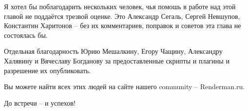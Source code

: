  Я хотел бы поблагодарить нескольких человек, чья
    помошь в работе над этой главой не поддаётся трезвой оценке. Это
    Александр Сегаль, Сергей Невшупов, Константин Харитонов – без их
    комментариев, поправок и советов эта глава не состоялась
    бы.

 Отдельная благодарность Юрию Мешалкину, Егору
    Чащину, Александру Халявину и Вячеславу Богданову за
    предоставленные скрипты и плагины и разрешение их
    опубликовать.

 Вы можете найти всех этих людей на сайте
    нашего community – Renderman.ru.

 До встречи – и успехов!
